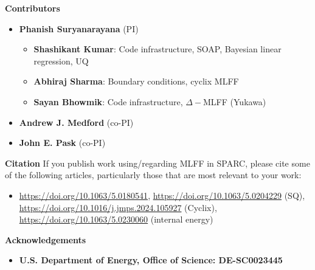 

\begin{frame}[allowframebreaks]{\textbf{Contributors}} \label{Contributors}

	\begin{itemize}
	\item \textbf{Phanish Suryanarayana} (PI)
	\begin{itemize}
 	    \item \textbf{Shashikant Kumar}: Code infrastructure, SOAP, Bayesian linear regression, UQ \\    
 	    \item \textbf{Abhiraj Sharma}: Boundary conditions, cyclix MLFF \\  
        \item \textbf{Sayan Bhowmik\footnotemark[1]}: Code infrastructure, $\Delta-$MLFF (Yukawa)
 	\end{itemize}
  \item \textbf{Andrew J. Medford} (co-PI)
  \item \textbf{John E. Pask} (co-PI)

 	\end{itemize}
\end{frame}


\begin{frame}[allowframebreaks]{\textbf{Citation}} \label{Citation}
If you publish work using/regarding MLFF in SPARC, please cite some of the following articles, particularly those that are most relevant to your work:
\begin{itemize}
    \item \url{https://doi.org/10.1063/5.0180541}, \url{https://doi.org/10.1063/5.0204229} (SQ), \url{https://doi.org/10.1016/j.jmps.2024.105927} (Cyclix), \url{https://doi.org/10.1063/5.0230060} (internal energy)

\end{itemize}
\end{frame}


\begin{frame}[allowframebreaks]{\textbf{Acknowledgements}} \label{Acknowledgements}
\begin{itemize}
    \item \textbf{U.S. Department of Energy, Office of Science: DE-SC0023445 
        } \\
\end{itemize}
\end{frame}


